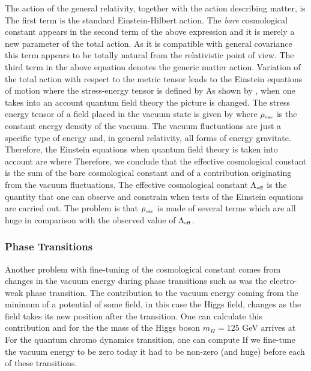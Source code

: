 The action of the general relativity, together with the action describing matter, is
The first term is the standard Einstein-Hilbert action. The \textit{bare} cosmological constant appears in the second term of the above expression and it is merely a new parameter of the total action. As it is compatible with general covariance this term appears to be totally natural from the relativistic point of view. The third term in the above equation denotes the generic matter action. Variation of the total action with respect to the metric tensor leads to the Einstein equations of motion
where the stress-energy tensor is defined by
As shown by \textcite{1968SPhD...12.1040S}, when one takes into an account quantum field theory the picture is changed. The stress energy tensor of a field placed in the vacuum state is given by
where $\rho_\text{\tiny vac}$ is the constant energy density of the vacuum. The vacuum fluctuations are just a specific type of energy and, in general relativity, all forms of energy gravitate. Therefore, the Einstein equations when quantum field theory is taken into account are
where
Therefore, we conclude that the effective cosmological constant is the sum of the bare cosmological constant and of a contribution originating from the vacuum fluctuations. The effective cosmological constant $\Lambda_\text{\tiny eff}$ is the quantity that one can observe and constrain when tests of the Einstein equations are carried out. The problem is that $\rho_\text{\tiny vac}$ is made of several terms which are all huge in comparison with the observed value of $\Lambda_\text{\tiny eff}$.
\subsubsection{Phase Transitions}
Another problem with fine-tuning of the cosmological constant comes from changes in the vacuum energy during phase transitions such as was the electro-weak phase transition. The contribution to the vacuum energy coming from the minimum of a potential of some field, in this case the Higgs field, changes as the field takes its new position after the transition. One can calculate this contribution \parencite{2012CRPhy..13..566M} and for the the mass of the Higgs boson $m_H=125$ GeV arrives at
For the quantum chromo dynamics transition, one can compute
If we fine-tune the vacuum energy to be zero today it had to be non-zero (and huge) before each of these transitions.
